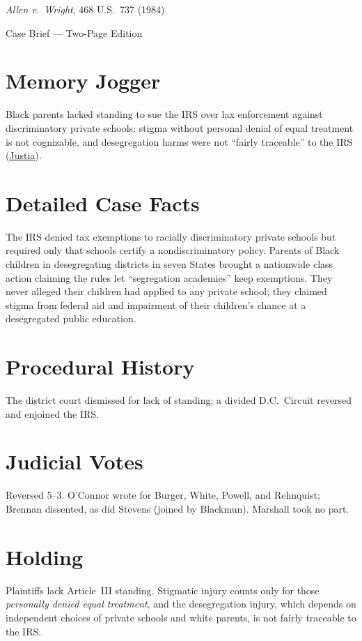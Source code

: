 \documentclass[12pt]{article}
\begin{document}
\begin{center}
{\LARGE \textit{Allen v.\ Wright}, 468 U.S.\ 737 (1984)\par}
\vspace{0.5em}
{\large Case Brief --- Two-Page Edition\par}
\end{center}

\section{Memory Jogger}
Black parents lacked standing to sue the IRS over lax enforcement against discriminatory private schools: stigma without personal denial of equal treatment is not cognizable, and desegregation harms were not ``fairly traceable'' to the IRS (\href{https://supreme.justia.com/cases/federal/us/468/737/}{Justia}).

\section{Detailed Case Facts}
The IRS denied tax exemptions to racially discriminatory private schools but required only that schools certify a nondiscriminatory policy. Parents of Black children in desegregating districts in seven States brought a nationwide class action claiming the rules let ``segregation academies'' keep exemptions. They never alleged their children had applied to any private school; they claimed stigma from federal aid and impairment of their children's chance at a desegregated public education.

\section{Procedural History}
The district court dismissed for lack of standing; a divided D.C.\ Circuit reversed and enjoined the IRS.

\section{Judicial Votes}
Reversed 5--3. O'Connor wrote for Burger, White, Powell, and Rehnquist; Brennan dissented, as did Stevens (joined by Blackmun). Marshall took no part.

\section{Holding}
Plaintiffs lack Article~III standing. Stigmatic injury counts only for those \textit{personally denied equal treatment}, and the desegregation injury, which depends on independent choices of private schools and white parents, is not fairly traceable to the IRS.
\end{document}
